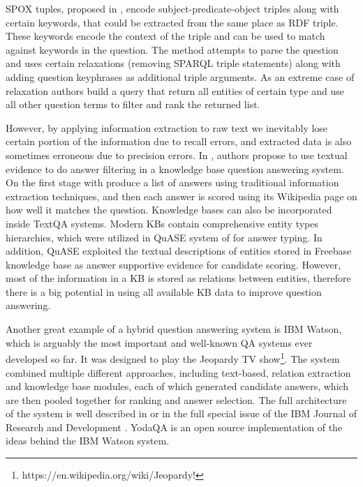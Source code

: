 SPOX tuples, proposed in \cite{yahya2013robust}, encode subject-predicate-object triples along with certain keywords, that could be extracted from the same place as RDF triple.
These keywords encode the context of the triple and can be used to match against keywords in the question. The method attempts to parse the question and uses certain relaxations (removing SPARQL triple statements) along with adding question keyphrases as additional triple arguments.
As an extreme case of relaxation authors build a query that return all entities of certain type and use all other question terms to filter and rank the returned list.

However, by applying information extraction to raw text we inevitably lose certain portion of the information due to recall errors, and extracted data is also sometimes erroneous due to precision errors.
In \cite{xu2016enhancing}, authors propose to use textual evidence to do answer filtering in a knowledge base question answering system.
On the first stage with produce a list of answers using traditional information extraction techniques, and then each answer is scored using its Wikipedia page on how well it matches the question. 
Knowledge bases can also be incorporated inside TextQA systems.
Modern KBs contain comprehensive entity types hierarchies, which were utilized in QuASE system of \cite{Sun:2015:ODQ:2736277.2741651} for answer typing.
In addition, QuASE exploited the textual descriptions of entities stored in Freebase knowledge base as answer supportive evidence for candidate scoring.
However, most of the information in a KB is stored as relations between entities, therefore there is a big potential in using all available KB data to improve question answering.

Another great example of a hybrid question answering system is IBM Watson, which is arguably the most important and well-known QA systems ever developed so far.
It was designed to play the Jeopardy TV show\footnote{https://en.wikipedia.org/wiki/Jeopardy!}.
The system combined multiple different approaches, including text-based, relation extraction and knowledge base modules, each of which generated candidate answers, which are then pooled together for ranking and answer selection.
The full architecture of the system is well described in \cite{ferrucci2010building} or in the full special issue of the IBM Journal of Research and Development \cite{ibm_watson_special_issue}.
YodaQA \cite{baudivs2015yodaqa} is an open source implementation of the ideas behind the IBM Watson system.

